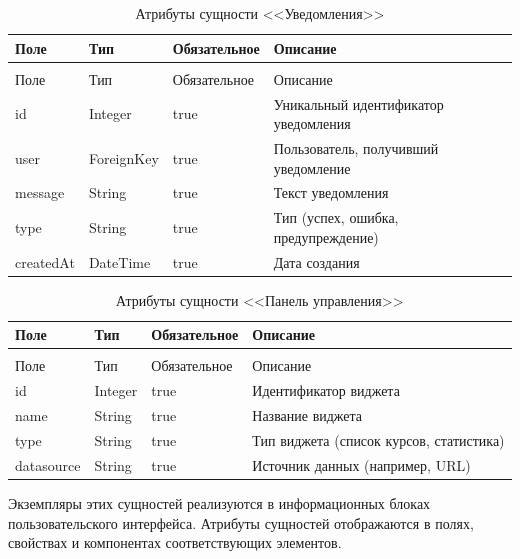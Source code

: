 \begin{xltabular}{\textwidth}{|l|l|p{3.2cm}|X|}
  \caption{Атрибуты сущности <<Уведомления>>\label{notifications:table}}\\ \hline
  Поле & Тип & Обязательное & Описание \\ \hline
  \endfirsthead
  \\ \hline
  Поле & Тип & Обязательное & Описание \\ \hline
  \endhead
  id & Integer & true & Уникальный идентификатор уведомления \\ \hline
  user & ForeignKey & true & Пользователь, получивший уведомление \\ \hline
  message & String & true & Текст уведомления \\ \hline
  type & String & true & Тип (успех, ошибка, предупреждение) \\ \hline
  createdAt & DateTime & true & Дата создания \\ \hline
\end{xltabular}

\begin{xltabular}{\textwidth}{|l|l|p{3.2cm}|X|}
  \caption{Атрибуты сущности <<Панель управления>>\label{dashboard:table}}\\ \hline
  Поле & Тип & Обязательное & Описание \\ \hline
  \endfirsthead
  \\ \hline
  Поле & Тип & Обязательное & Описание \\ \hline
  \endhead
  id & Integer & true & Идентификатор виджета \\ \hline
  name & String & true & Название виджета \\ \hline
  type & String & true & Тип виджета (список курсов, статистика) \\ \hline
  datasource & String & true & Источник данных (например, URL) \\ \hline
\end{xltabular}


Экземпляры этих сущностей реализуются в информационных блоках пользовательского интерфейса. Атрибуты сущностей отображаются в полях, свойствах и компонентах соответствующих элементов.

